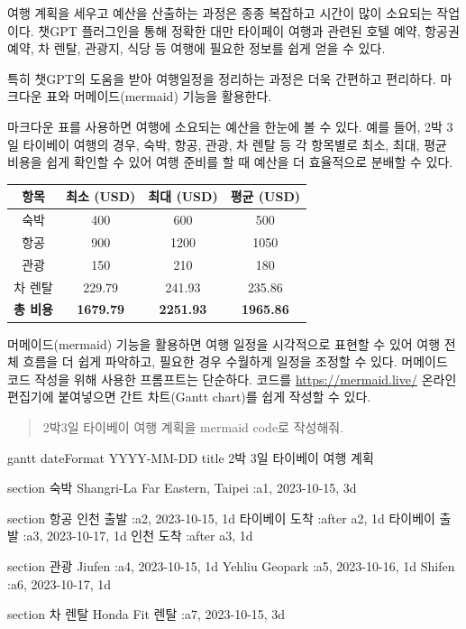 \documentclass[
  letterpaper,
]{book}
\newenvironment{Shaded}{\begin{snugshade}}{\end{snugshade}}
\newcommand{\NormalTok}[1]{\textcolor[rgb]{0.00,0.23,0.31}{#1}}
\begin{document}
여행 계획을 세우고 예산을 산출하는 과정은 종종 복잡하고 시간이 많이
소요되는 작업이다. 챗GPT 플러그인을 통해 정확한 대만 타이페이 여행과
관련된 호텔 예약, 항공권 예약, 차 렌탈, 관광지, 식당 등 여행에 필요한
정보를 쉽게 얻을 수 있다.

특히 챗GPT의 도움을 받아 여행일정을 정리하는 과정은 더욱 간편하고
편리하다. 마크다운 표와 머메이드(mermaid) 기능을 활용한다.

마크다운 표를 사용하면 여행에 소요되는 예산을 한눈에 볼 수 있다. 예를
들어, 2박 3일 타이베이 여행의 경우, 숙박, 항공, 관광, 차 렌탈 등 각
항목별로 최소, 최대, 평균 비용을 쉽게 확인할 수 있어 여행 준비를 할 때
예산을 더 효율적으로 분배할 수 있다.

\begin{longtable}[]{@{}cccc@{}}
\toprule\noalign{}
항목 & 최소 (USD) & 최대 (USD) & 평균 (USD) \\
\midrule\noalign{}
\endhead
\bottomrule\noalign{}
\endlastfoot
숙박 & 400 & 600 & 500 \\
항공 & 900 & 1200 & 1050 \\
관광 & 150 & 210 & 180 \\
차 렌탈 & 229.79 & 241.93 & 235.86 \\
\textbf{총 비용} & \textbf{1679.79} & \textbf{2251.93} &
\textbf{1965.86} \\
\end{longtable}

머메이드(mermaid) 기능을 활용하면 여행 일정을 시각적으로 표현할 수 있어
여행 전체 흐름을 더 쉽게 파악하고, 필요한 경우 수월하게 일정을 조정할 수
있다. 머메이드 코드 작성을 위해 사용한 프롬프트는 단순하다. 코드를
\url{https://mermaid.live/} 온라인 편집기에 붙여넣으면 간트 차트(Gantt
chart)를 쉽게 작성할 수 있다.

\begin{quote}
2박3일 타이베이 여행 계획을 mermaid code로 작성해줘.
\end{quote}

\begin{Shaded}
\begin{Highlighting}[]
\NormalTok{gantt}
\NormalTok{    dateFormat  YYYY{-}MM{-}DD}
\NormalTok{    title 2박 3일 타이베이 여행 계획}

\NormalTok{    section 숙박}
\NormalTok{    Shangri{-}La Far Eastern, Taipei :a1, 2023{-}10{-}15, 3d}

\NormalTok{    section 항공}
\NormalTok{    인천 출발 :a2, 2023{-}10{-}15, 1d}
\NormalTok{    타이베이 도착 :after a2, 1d}
\NormalTok{    타이베이 출발 :a3, 2023{-}10{-}17, 1d}
\NormalTok{    인천 도착 :after a3, 1d}

\NormalTok{    section 관광}
\NormalTok{    Jiufen :a4, 2023{-}10{-}15, 1d}
\NormalTok{    Yehliu Geopark :a5, 2023{-}10{-}16, 1d}
\NormalTok{    Shifen :a6, 2023{-}10{-}17, 1d}

\NormalTok{    section 차 렌탈}
\NormalTok{    Honda Fit 렌탈 :a7, 2023{-}10{-}15, 3d}
\end{Highlighting}
\end{Shaded}
\end{document}
